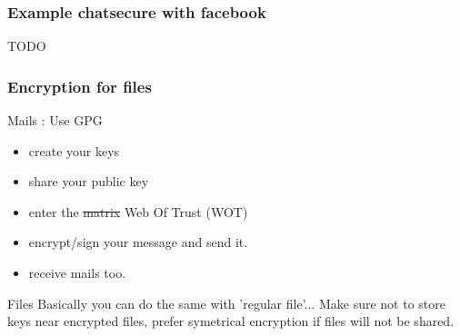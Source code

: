 \begin{frame}
\frametitle{Example chatsecure with facebook}
TODO
\end{frame}
\begin{frame}
\frametitle{Encryption for files}
\begin{block}{Mails : Use GPG}
\begin{itemize}
\item create your keys
\item share your public key
\item enter the \sout{matrix} Web Of Trust (WOT)
\item encrypt/sign your message and send it.
\item receive mails too.
\end{itemize}
\end{block}
\begin{block}{Files}
Basically you can do the same with 'regular file'...
Make sure not to store keys near encrypted files, prefer symetrical encryption
if files will not be shared.
\end{block}
\end{frame}

